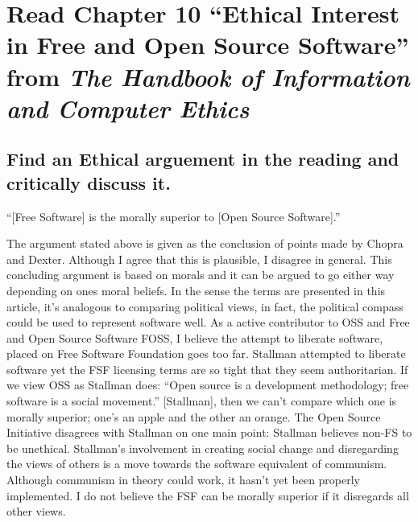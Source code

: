 \section{Read Chapter 10 ``Ethical Interest in Free and Open Source Software'' from \textit{The Handbook of Information and Computer Ethics}}
\subsection{Find an Ethical arguement in the reading and critically discuss it.}

\begin{center}
``[Free Software] is the morally superior to [Open Source Software].''
\end{center}

The argument stated above is given as the conclusion of points made by Chopra and Dexter. Although I agree that this is plausible, I disagree in general. This concluding argument is based on morals and it can be argued to go either way depending on ones moral beliefs. In the sense the terms are presented in this article, it's analogous to comparing political views, in fact, the political compass could be used to represent software well. As a active contributor to OSS and Free and Open Source Software FOSS, I believe the attempt to liberate software, placed on Free Software Foundation goes too far. Stallman attempted to liberate software yet the FSF licensing terms are so tight that they seem authoritarian. If we view OSS as Stallman does: ``Open source is a development methodology; free software is a social movement.'' [Stallman], then we can't compare which one is morally superior; one's an apple and the other an orange. The Open Source Initiative disagrees with Stallman on one main point: Stallman believes non-FS to be unethical. Stallman's involvement in creating social change and disregarding the views of others is a move towards the software equivalent of communism. Although communism in theory could work, it hasn't yet been properly implemented. I do not believe the FSF can be morally superior if it disregards all other views.